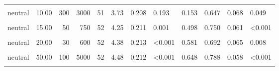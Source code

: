 \documentclass[
]{article}
\begin{document}
\begin{longtable}[t]{lrrrrrrlrrrl}
\hspace{1em}\cellcolor{gray!10}{neutral} & \cellcolor{gray!10}{10.00} & \cellcolor{gray!10}{40} & \cellcolor{gray!10}{400} & \cellcolor{gray!10}{52} & \cellcolor{gray!10}{4.02} & \cellcolor{gray!10}{0.224} & \cellcolor{gray!10}{0.024} & \cellcolor{gray!10}{0.324} & \cellcolor{gray!10}{0.673} & \cellcolor{gray!10}{0.066} & \cellcolor{gray!10}{0.018}\\
\hspace{1em}neutral & 10.00 & 300 & 3000 & 51 & 3.73 & 0.208 & 0.193 & 0.153 & 0.647 & 0.068 & 0.049\\
\hspace{1em}\cellcolor{gray!10}{neutral} & \cellcolor{gray!10}{15.00} & \cellcolor{gray!10}{20} & \cellcolor{gray!10}{300} & \cellcolor{gray!10}{49} & \cellcolor{gray!10}{3.61} & \cellcolor{gray!10}{0.222} & \cellcolor{gray!10}{0.518} & \cellcolor{gray!10}{0.073} & \cellcolor{gray!10}{0.612} & \cellcolor{gray!10}{0.071} & \cellcolor{gray!10}{0.152}\\
\hspace{1em}neutral & 15.00 & 50 & 750 & 52 & 4.25 & 0.211 & 0.001 & 0.498 & 0.750 & 0.061 & <0.001\\
\hspace{1em}\cellcolor{gray!10}{neutral} & \cellcolor{gray!10}{20.00} & \cellcolor{gray!10}{10} & \cellcolor{gray!10}{200} & \cellcolor{gray!10}{48} & \cellcolor{gray!10}{3.75} & \cellcolor{gray!10}{0.245} & \cellcolor{gray!10}{0.272} & \cellcolor{gray!10}{0.149} & \cellcolor{gray!10}{0.625} & \cellcolor{gray!10}{0.071} & \cellcolor{gray!10}{0.111}\\
\hspace{1em}neutral & 20.00 & 30 & 600 & 52 & 4.38 & 0.213 & <0.001 & 0.581 & 0.692 & 0.065 & 0.008\\
\hspace{1em}\cellcolor{gray!10}{neutral} & \cellcolor{gray!10}{50.00} & \cellcolor{gray!10}{10} & \cellcolor{gray!10}{500} & \cellcolor{gray!10}{49} & \cellcolor{gray!10}{4.08} & \cellcolor{gray!10}{0.220} & \cellcolor{gray!10}{0.011} & \cellcolor{gray!10}{0.381} & \cellcolor{gray!10}{0.735} & \cellcolor{gray!10}{0.064} & \cellcolor{gray!10}{0.001}\\
\hspace{1em}neutral & 50.00 & 100 & 5000 & 52 & 4.48 & 0.212 & <0.001 & 0.648 & 0.788 & 0.058 & <0.001\\
\hspace{1em}\cellcolor{gray!10}{neutral} & \cellcolor{gray!10}{100.00} & \cellcolor{gray!10}{30} & \cellcolor{gray!10}{3000} & \cellcolor{gray!10}{49} & \cellcolor{gray!10}{4.10} & \cellcolor{gray!10}{0.217} & \cellcolor{gray!10}{0.008} & \cellcolor{gray!10}{0.400} & \cellcolor{gray!10}{0.673} & \cellcolor{gray!10}{0.068} & \cellcolor{gray!10}{0.021}\\

\end{longtable}
\end{document}
